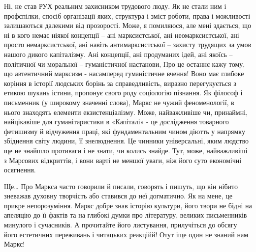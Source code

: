 \documentclass{kapital}
\begin{document}
	Ні, не став РУХ  реальним захисником трудового люду. Як не стали ним і профспілки, спосіб організації яких, структура і зміст роботи, права і можливості  залишаються далекими від прозорості. Може, я помиляюся, але мені здається, що ні в кого немає ніякої концепції – ані марксистської, ані неомарксистської, ані просто немарксистської, ані навіть антимарксистської – захисту трудящих за умов нашого дикого капіталізму. Ані концепції, ані продуманих ідей, ані якоїсь – політичної чи моральної – гуманістичної настанови, Про це останнє кажу тому, що автентичний марксизм  - насамперед гуманістичне вчення! Воно має глибоке коріння в історії людських борінь за справедливість, виразно перегукується з етикою шукань істини, пропонує свого роду соціологію пізнання. Як філософ і письменник (у широкому значенні слова), Маркс не чужий феноменології, в нього знаходять елементи екзистенціалізму.  Може, найважливіше чи, принаймні, найцікавіше для гуманітаристики в «Капіталі» - це дослідження товарного фетишизму й відчуження праці, які фундаментальним чином діютть у напрямку збіднення світу людини, її знелюднення. Це чинники універсальні, яким людство ще не знайшло противаги і не знати, чи колись знайде. Тут, може, найважливіші з Марсових  відкриттів, і вони варті не меншої уваги, ніж його суто економічні осягнення. 
 
	Ще… Про Маркса часто говорили й писали, говорять і пишуть, що він нібито зневажав духовну творчість або ставився до неї догматично. Як на мене, це прикре непорозуміння. Маркс добре знав історію культури, його твори не бідні на апеляцію до її фактів та  на глибокі думки про літературу, великих письменників минулого і сучасників. А прочитайте його листування, прилучіться до обсягу його естетичних переживань і читацьких реакційй! Отут іще один не знаний нам Маркс!
 
   
 
\end{document}
